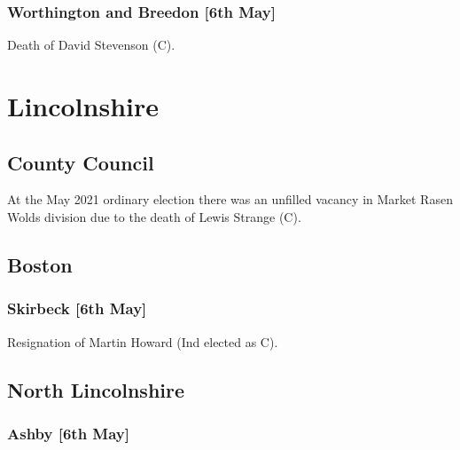 \documentclass[a4paper,openany]{book}
\begin{document}
\begin{resultsiii}
\subsubsection*{Worthington and Breedon \hspace*{\fill}\nolinebreak[1]%
	\enspace\hspace*{\fill}
	[6th May]}


Death of David Stevenson (C).

\section{Lincolnshire}

\subsection*{County Council}

At the May 2021 ordinary election there was an unfilled vacancy in Market Rasen Wolds division due to the death of Lewis Strange (C).%

\subsection*{Boston}

\subsubsection*{Skirbeck \hspace*{\fill}\nolinebreak[1]%
	\enspace\hspace*{\fill}
	[6th May]}


Resignation of Martin Howard (Ind elected as C).

\subsection*{North Lincolnshire}

\subsubsection*{Ashby \hspace*{\fill}\nolinebreak[1]%
	\enspace\hspace*{\fill}
	[6th May]}


\end{resultsiii}
\end{document}
